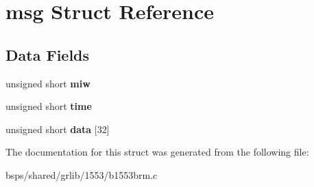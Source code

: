 \hypertarget{structmsg}{}\section{msg Struct Reference}
\label{structmsg}
\subsection*{Data Fields}
\begin{DoxyCompactItemize}
\item 
\mbox{\label{structmsg_aa6912da2d2fd8afb4e288ca838fb1803}} 
unsigned short {\bfseries miw}
\item 
\mbox{\label{structmsg_a557f7fb5355f334932e92cd2f23dd843}} 
unsigned short {\bfseries time}
\item 
\mbox{\label{structmsg_af3d26a02bb75cb92c033c3cc9ef5c30b}} 
unsigned short {\bfseries data} \mbox{[}32\mbox{]}
\end{DoxyCompactItemize}


The documentation for this struct was generated from the following file\+:\begin{DoxyCompactItemize}
\item 
bsps/shared/grlib/1553/b1553brm.\+c\end{DoxyCompactItemize}
